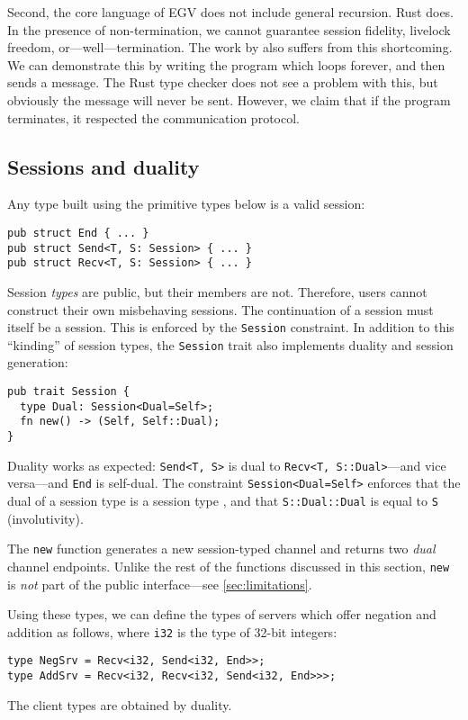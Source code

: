 \documentclass[sigconf,natbib=false]{acmart}
\begin{document}
Second, the core language of EGV does not include general recursion. Rust does. In the presence of non-termination, we cannot guarantee session fidelity, livelock freedom, or---well---termination. The work by \textcite{jespersen2015} also suffers from this shortcoming. We can demonstrate this by writing the program which loops forever, and then sends a message. The Rust type checker does not see a problem with this, but obviously the message will never be sent. However, we claim that if the program terminates, it respected the communication protocol.

\subsection{Sessions and duality}
Any type built using the primitive types below is a valid session:
\begin{lstlisting}
pub struct End { ... }
pub struct Send<T, S: Session> { ... }
pub struct Recv<T, S: Session> { ... }
\end{lstlisting}
Session \emph{types} are public, but their members are not. Therefore, users cannot construct their own misbehaving sessions. The continuation of a session must itself be a session. This is enforced by the \lstinline{Session} constraint. In addition to this ``kinding'' of session types, the \lstinline{Session} trait also implements duality and session generation:
\begin{lstlisting}
pub trait Session {
  type Dual: Session<Dual=Self>;
  fn new() -> (Self, Self::Dual);
}
\end{lstlisting}
Duality works as expected: \lstinline{Send<T, S>} is dual to \lstinline{Recv<T, S::Dual>}---and vice versa---and \lstinline{End} is self-dual. The constraint \lstinline{Session<Dual=Self>} enforces that the dual of a session type is a session type , and that \lstinline{S::Dual::Dual} is equal to \lstinline{S} (involutivity).

The \lstinline{new} function generates a new session-typed channel and returns two \emph{dual} channel endpoints. Unlike the rest of the functions discussed in this section, \lstinline{new} is \emph{not} part of the public interface---see \cref{sec:limitations}.

Using these types, we can define the types of servers which offer negation and addition as follows, where \lstinline{i32} is the type of 32-bit integers:
\begin{lstlisting}
type NegSrv = Recv<i32, Send<i32, End>>;
type AddSrv = Recv<i32, Recv<i32, Send<i32, End>>>;
\end{lstlisting}
The client types are obtained by duality.
\end{document}
